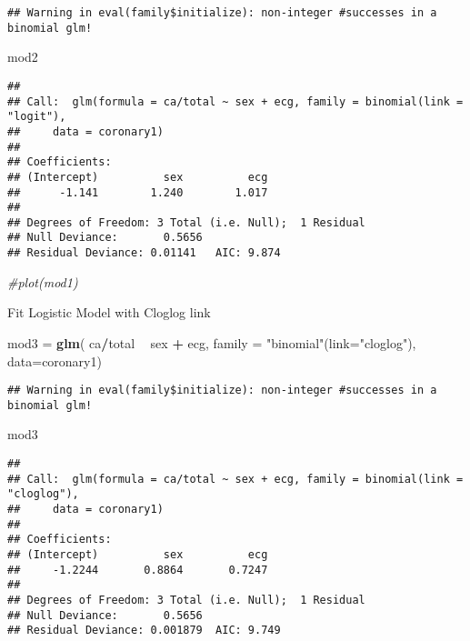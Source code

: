 \documentclass[]{article}
\newenvironment{Shaded}{\begin{snugshade}}{\end{snugshade}}
\newcommand{\KeywordTok}[1]{\textcolor[rgb]{0.13,0.29,0.53}{\textbf{#1}}}
\newcommand{\DataTypeTok}[1]{\textcolor[rgb]{0.13,0.29,0.53}{#1}}
\newcommand{\StringTok}[1]{\textcolor[rgb]{0.31,0.60,0.02}{#1}}
\newcommand{\CommentTok}[1]{\textcolor[rgb]{0.56,0.35,0.01}{\textit{#1}}}
\newcommand{\OperatorTok}[1]{\textcolor[rgb]{0.81,0.36,0.00}{\textbf{#1}}}
\newcommand{\NormalTok}[1]{#1}
\begin{document}
\begin{verbatim}
## Warning in eval(family$initialize): non-integer #successes in a binomial glm!
\end{verbatim}

\begin{Shaded}
\begin{Highlighting}[]
\NormalTok{mod2}
\end{Highlighting}
\end{Shaded}

\begin{verbatim}
## 
## Call:  glm(formula = ca/total ~ sex + ecg, family = binomial(link = "logit"), 
##     data = coronary1)
## 
## Coefficients:
## (Intercept)          sex          ecg  
##      -1.141        1.240        1.017  
## 
## Degrees of Freedom: 3 Total (i.e. Null);  1 Residual
## Null Deviance:       0.5656 
## Residual Deviance: 0.01141   AIC: 9.874
\end{verbatim}

\begin{Shaded}
\begin{Highlighting}[]
\CommentTok{#plot(mod1)}
\end{Highlighting}
\end{Shaded}

Fit Logistic Model with Cloglog link

\begin{Shaded}
\begin{Highlighting}[]
\NormalTok{mod3 =}\StringTok{ }\KeywordTok{glm}\NormalTok{( ca}\OperatorTok{/}\NormalTok{total }\OperatorTok{~}\StringTok{ }\NormalTok{sex }\OperatorTok{+}\StringTok{ }\NormalTok{ecg,}
            \DataTypeTok{family =} \StringTok{"binomial"}\NormalTok{(}\DataTypeTok{link=}\StringTok{"cloglog"}\NormalTok{),}
            \DataTypeTok{data=}\NormalTok{coronary1)}
\end{Highlighting}
\end{Shaded}

\begin{verbatim}
## Warning in eval(family$initialize): non-integer #successes in a binomial glm!
\end{verbatim}

\begin{Shaded}
\begin{Highlighting}[]
\NormalTok{mod3}
\end{Highlighting}
\end{Shaded}

\begin{verbatim}
## 
## Call:  glm(formula = ca/total ~ sex + ecg, family = binomial(link = "cloglog"), 
##     data = coronary1)
## 
## Coefficients:
## (Intercept)          sex          ecg  
##     -1.2244       0.8864       0.7247  
## 
## Degrees of Freedom: 3 Total (i.e. Null);  1 Residual
## Null Deviance:       0.5656 
## Residual Deviance: 0.001879  AIC: 9.749
\end{verbatim}
\end{document}
